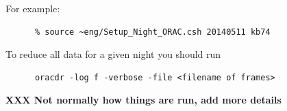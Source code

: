 \documentclass[twoside,11pt]{article}
\newcommand{\xref}[3]{#1}
\renewcommand{\_}{\texttt{\symbol{95}}}
\newcommand{\GAIA}{\xref{{\sc{Gaia}}}{sun214}{}}
\newcommand{\KAPPA}{\xref{{\sc{Kappa}}}{sun95}{}}
\newcommand{\ORACDR}{{\footnotesize ORAC-DR}}
\begin{document}
For example:

\begin{verbatim}
      % source ~eng/Setup_Night_ORAC.csh 20140511 kb74
\end{verbatim}

To reduce all data for a given night you should run 

\begin{verbatim}
      oracdr -log f -verbose -file <filename of frames>
\end{verbatim}

\textbf{XXX Not normally how things are run, add more details}

%
%
%
%
%
%
%
%
%
\end{document}
